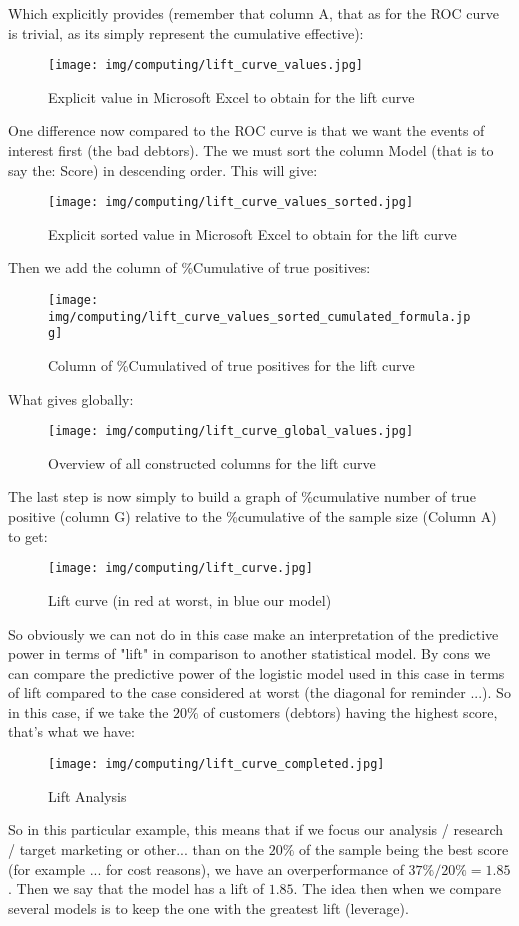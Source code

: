 	Which explicitly provides (remember that column A, that as for the ROC curve is trivial, as its simply represent the cumulative effective):
	\begin{figure}[H]
		\centering
		\texttt{[image: img/computing/lift\_curve\_values.jpg]}
		\caption[]{Explicit value in Microsoft Excel to obtain for the lift curve}
	\end{figure}
	One difference now compared to the ROC curve is that we want the events of interest first (the bad debtors). The we must sort the column Model (that is to say the: Score) in descending order. This will give:
	\begin{figure}[H]
		\centering
		\texttt{[image: img/computing/lift\_curve\_values\_sorted.jpg]}
		\caption[]{Explicit sorted value in Microsoft Excel to obtain for the lift curve}
	\end{figure}
	Then we add the column of \%Cumulative of true positives:
	\begin{figure}[H]
		\centering
		\texttt{[image: img/computing/lift\_curve\_values\_sorted\_cumulated\_formula.jpg]}
		\caption[]{Column of \%Cumulatived of true positives for the lift curve}
	\end{figure}
	What gives globally:
	\begin{figure}[H]
		\centering
		\texttt{[image: img/computing/lift\_curve\_global\_values.jpg]}
		\caption{Overview of all constructed columns for the lift curve}
	\end{figure}
	The last step is now simply to build a graph of \%cumulative number of true positive (column G) relative to the \%cumulative of the sample size (Column A) to get:
	\begin{figure}[H]
		\centering
		\texttt{[image: img/computing/lift\_curve.jpg]}
		\caption[]{Lift curve (in red at worst, in blue our model)}
	\end{figure}
	So obviously we can not do in this case make an interpretation of the predictive power in terms of "lift" in comparison to another statistical model. By cons we can compare the predictive power of the logistic model used in this case in terms of lift compared to the case considered at worst (the diagonal for reminder ...). So in this case, if we take the $20\%$ of customers (debtors) having the highest score, that's what we have:
	\begin{figure}[H]
		\centering
		\texttt{[image: img/computing/lift\_curve\_completed.jpg]}
		\caption[]{Lift Analysis}
	\end{figure}
	So in this particular example, this means that if we focus our analysis / research / target marketing or other... than on the $20\%$ of the sample being the best score (for example ... for cost reasons), we have an overperformance of $37\% / 20\% = 1.85$. Then we say that the model has a lift of $1.85$. The idea then when we compare several models is to keep the one with the greatest lift (leverage).
	

